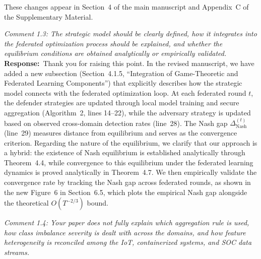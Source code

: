 \documentclass[12pt,a4paper]{article}
\newcommand{\RC}[1]{\noindent\textit{#1}\vspace{0.3em}\\}
\newcommand{\AR}{\noindent\textbf{Response:}~}
\begin{document}
These changes appear in Section~4 of the main manuscript and Appendix~C of the Supplementary Material.

\vspace{0.8em}

\RC{Comment 1.3: The strategic model should be clearly defined, how it integrates into the federated optimization process should be explained, and whether the equilibrium conditions are obtained analytically or empirically validated.}

\AR Thank you for raising this point. In the revised manuscript, we have added a new subsection (Section~4.1.5, ``Integration of Game-Theoretic and Federated Learning Components'') that explicitly describes how the strategic model connects with the federated optimization loop. At each federated round $t$, the defender strategies are updated through local model training and secure aggregation (Algorithm~2, lines 14--22), while the adversary strategy is updated based on observed cross-domain detection rates (line~28). The Nash gap $\Delta_{\text{Nash}}^{(t)}$ (line~29) measures distance from equilibrium and serves as the convergence criterion. Regarding the nature of the equilibrium, we clarify that our approach is a hybrid: the existence of Nash equilibrium is established analytically through Theorem~4.4, while convergence to this equilibrium under the federated learning dynamics is proved analytically in Theorem~4.7. We then empirically validate the convergence rate by tracking the Nash gap across federated rounds, as shown in the new Figure~6 in Section~6.5, which plots the empirical Nash gap alongside the theoretical $O(T^{-2/3})$ bound.

\vspace{0.8em}

\RC{Comment 1.4: Your paper does not fully explain which aggregation rule is used, how class imbalance severity is dealt with across the domains, and how feature heterogeneity is reconciled among the IoT, containerized systems, and SOC data streams.}
\end{document}

